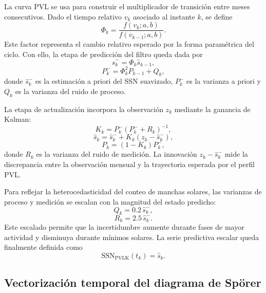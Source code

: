 La curva PVL se usa para construir el multiplicador de transición entre meses consecutivos. Dado el tiempo relativo $v_k$ asociado al instante $k$, se define
\begin{equation}
\Phi_k=\frac{f(v_k;a,b)}{f(v_{k-1};a,b)}.
\end{equation}
Este factor representa el cambio relativo esperado por la forma paramétrica del ciclo. Con ello, la etapa de predicción del filtro queda dada por
\begin{equation}
\widehat{s}_{k}^{-}=\Phi_k\widehat{s}_{k-1},
\end{equation}
\begin{equation}
P_k^{-}=\Phi_k^{2}P_{k-1}+Q_k,
\end{equation}
donde $\widehat{s}_{k}^{-}$ es la estimación a priori del SSN suavizado, $P_k^{-}$ es la varianza a priori y $Q_k$ es la varianza del ruido de proceso.

La etapa de actualización incorpora la observación $z_k$ mediante la ganancia de Kalman:
\begin{equation}
K_k=P_k^{-}\left(P_k^{-}+R_k\right)^{-1},
\end{equation}
\begin{equation}
\widehat{s}_{k}=\widehat{s}_{k}^{-}+K_k\left(z_k-\widehat{s}_{k}^{-}\right),
\end{equation}
\begin{equation}
P_k=(1-K_k)P_k^{-},
\end{equation}
donde $R_k$ es la varianza del ruido de medición. La innovación $z_k-\widehat{s}_{k}^{-}$ mide la discrepancia entre la observación mensual y la trayectoria esperada por el perfil PVL.

Para reflejar la heterocedasticidad del conteo de manchas solares, las varianzas de proceso y medición se escalan con la magnitud del estado predicho:
\begin{equation}
Q_k=0.2\,\widehat{s}_{k}^{-},
\end{equation}
\begin{equation}
R_k=2.5\,\widehat{s}_{k}^{-}.
\end{equation}
Este escalado permite que la incertidumbre aumente durante fases de mayor actividad y disminuya durante mínimos solares. La serie predictiva escalar queda finalmente definida como
\begin{equation}
\mathrm{SSN}_{\mathrm{PVLK}}(t_k)=\widehat{s}_{k}.
\end{equation}

\subsection{Vectorización temporal del diagrama de Spörer}

